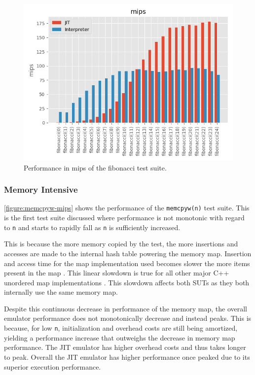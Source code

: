 \begin{figure}[h]
    \centering
    \includegraphics[scale=0.75]{output/graphs/tests/fibonacci/mips.png}
    \caption{Performance in mips of the fibonacci test suite.}
    \label{figure:fibonacci-mips}
\end{figure}

\subsubsection{Memory Intensive}

\autoref{figure:memcpyw-mips} shows the performance of the \texttt{memcpyw(n)} test suite. This is the first test suite discussed where performance is not monotonic with regard to \texttt{n} and starts to rapidly fall as \texttt{n} is sufficiently increased.

This is because the more memory copied by the test, the more insertions and accesses are made to the internal hash table powering the memory map. Insertion and access time for the map implementation used becomes slower the more items present in the map \cite{tessil-benchmark}. This linear slowdown is true for all other major C++ unordered map implementations \cite{tessil-benchmark}. This slowdown affects both SUTs as they both internally use the same memory map.

Despite this continuous decrease in performance of the memory map, the overall emulator performance does not monotonically decrease and instead peaks. This is because, for low \texttt{n}, initialization and overhead costs are still being amortized, yielding a performance increase that outweighs the decrease in memory map performance. The JIT emulator has higher overhead costs and thus takes longer to peak. Overall the JIT emulator has higher performance once peaked due to its superior execution performance.

